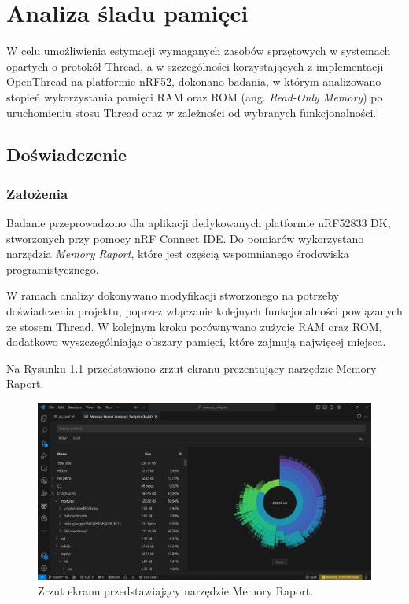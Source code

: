 \chapter{Analiza śladu pamięci}

W celu umożliwienia estymacji wymaganych zasobów sprzętowych w systemach opartych o protokół Thread, a w szczególności korzystających z implementacji OpenThread na platformie nRF52, dokonano badania, w którym analizowano stopień wykorzystania pamięci RAM oraz ROM (ang. \textit{Read-Only Memory}) po uruchomieniu stosu Thread oraz w zależności od wybranych funkcjonalności.

\section{Doświadczenie}

    \subsection{Założenia}

    Badanie przeprowadzono dla aplikacji dedykowanych platformie nRF52833 DK, stworzonych przy pomocy nRF Connect IDE. Do pomiarów wykorzystano narzędzia \textit{Memory Raport}, które jest częścią wspomnianego środowiska programistycznego. 
    
    W ramach analizy dokonywano modyfikacji stworzonego na potrzeby doświadczenia projektu, poprzez włączanie kolejnych funkcjonalności powiązanych ze stosem Thread. W kolejnym kroku porównywano zużycie RAM oraz ROM, dodatkowo wyszczególniając obszary pamięci, które zajmują najwięcej miejsca.

    Na Rysunku \ref{fig:memory-raport} przedstawiono zrzut ekranu prezentujący narzędzie Memory Raport.

    \begin{figure}[H]
        \centering
        \includegraphics[width=0.8\linewidth]{graphics/memory-raport.png}
        \caption{Zrzut ekranu przedstawiający narzędzie Memory Raport.}
        \label{fig:memory-raport}
    \end{figure}

